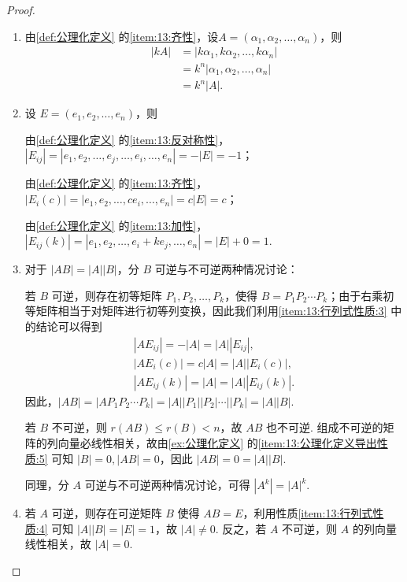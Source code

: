 \begin{proof}
    \begin{enumerate}[start=2]
        \item 由\autoref{def:公理化定义} 的\ref*{item:13:齐性}，设$A=(\alpha_1,\alpha_2,\ldots,\alpha_n)$，则
        \begin{align*}
            |kA| & =|k\alpha_1,k\alpha_2,\ldots,k\alpha_n| \\
                 & =k^n|\alpha_1,\alpha_2,\ldots,\alpha_n| \\
                 & =k^n|A|.
        \end{align*}

        \item 设 $E = (e_1, e_2, \ldots, e_n)$，则

            由\autoref{def:公理化定义} 的\ref*{item:13:反对称性}，$|E_{ij}| = |e_1, e_2, \ldots, e_j, \ldots, e_i, \ldots, e_n| = -|E| = -1$；

            由\autoref{def:公理化定义} 的\ref*{item:13:齐性}，$|E_i(c)| = |e_1, e_2, \ldots, c e_i, \ldots, e_n| = c|E| = c$；

            由\autoref{def:公理化定义} 的\ref*{item:13:加性}，$|E_{ij}(k)| = |e_1, e_2, \ldots, e_i + k e_j, \ldots, e_n| = |E| + 0 = 1$.

        \item 对于 $|AB| = |A||B|$，分 $B$ 可逆与不可逆两种情况讨论：

            若 $B$ 可逆，则存在初等矩阵 $P_1, P_2, \ldots, P_k$，使得 $B = P_1 P_2 \cdots P_k$；由于右乘初等矩阵相当于对矩阵进行初等列变换，因此我们利用\ref*{item:13:行列式性质:3} 中的结论可以得到
            \begin{gather*}
                |A E_{ij}| = -|A| = |A||E_{ij}|, \\
                |A E_i(c)| = c|A| = |A||E_i(c)|, \\
                |A E_{ij}(k)| = |A| = |A||E_{ij}(k)|.
            \end{gather*}
            因此，$|AB| = |A P_1 P_2 \cdots P_k| = |A||P_1||P_2|\cdots||P_k| = |A||B|$.

            若 $B$ 不可逆，则 $r(AB) \leqslant r(B) < n$，故 $AB$ 也不可逆. 组成不可逆的矩阵的列向量必线性相关，故由\autoref{ex:公理化定义} 的\ref*{item:13:公理化定义导出性质:5} 可知 $|B|=0, |AB|=0$，因此 $|AB| = 0 = |A||B|$.

            同理，分 $A$ 可逆与不可逆两种情况讨论，可得 $|A^k|=|A|^k$.

        \item 若 $A$ 可逆，则存在可逆矩阵 $B$ 使得 $AB=E$，利用性质\ref*{item:13:行列式性质:4} 可知 $|A||B|=|E|=1$，故 $|A| \neq 0$. 反之，若 $A$ 不可逆，则 $A$ 的列向量线性相关，故 $|A| = 0$.


\end{enumerate}
\end{proof}
